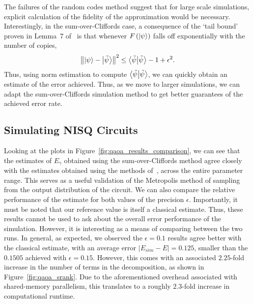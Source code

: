 The failures of the random codes method  suggest that for large scale simulations, explicit calculation of the fidelity of the approximation would be necessary. Interestingly, in the sum-over-Cliffords case, a consequence of the `tail bound' proven in Lemma~7 of~\cite{Bravyi2018} is that whenever $F\left(\ket{\psi}\right)$ falls off exponentially with the number of copies,
\begin{equation}
\norm{\ket{\psi}-\ket{\tilde{\psi}}}^{2} \leq \braket{\tilde{\psi}} -1 + \epsilon^{2}.
\end{equation}
Thus, using norm estimation to compute $\braket{\tilde{\psi}}$, we can quickly obtain an estimate of the error achieved. Thus, as we move to larger simulations, we can adapt the sum-over-Cliffords simulation method to get better guarantees of the achieved error rate.
\subsection{Simulating NISQ Circuits}
Looking at the plots in Figure~\ref{fig:qaoa_results_comparison}, we can see that the estimates of $E_{\gamma}$ obtained using the sum-over-Cliffords method agree closely with the estimates obtained using the methods of~\cite{VandenNest2009}, across the entire parameter range. This serves as a useful validation of the Metropolis method of sampling from the output distribution of the circuit. We can also compare the relative performance of the estimate for both values of the precision $\epsilon$. Importantly, it must be noted that our reference value is itself a classical estimate. Thus, these results cannot be used to ask about the overall error performance of the simulation. However, it is interesting as a means of comparing between the two runs. In general, as expected, we observed the $\epsilon=0.1$ results agree better with the classical estimate, with an average error $\left|E_{sim}-E\right|=0.125$, smaller than the $0.1505$ achieved with $\epsilon=0.15$. However, this comes with an associated $2.25$-fold increase in the number of terms in the decomposition, as shown in Figure~\ref{fig:qaoa_srank}. Due to the aforementioned overhead associated with shared-memory parallelism, this translates to a roughly $2.3$-fold increase in computational runtime.\par
